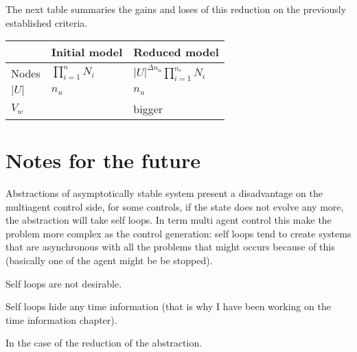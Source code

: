 The next table summaries the gains and loses of this reduction on the previously established criteria.

\begin{tabular}{ l|ll }
& Initial model & Reduced model\\ \hline
Nodes & $\prod_{i=1}^n N_i$ & $\left | U \right |^{\Delta n_u} \prod_{i=1}^{n_c} N_i $\\ 
$|U|$ & $n_u$ & $n_u$\\
$V_w$ &  & bigger \\
\end{tabular}

\section{Notes for the future}
Abstractions of asymptotically stable system present a disadvantage on the multiagent control side, for some controls, if the state does not evolve any more, the abstraction will take self loops.
In term multi agent control this make the problem more complex as the control generation: self loops tend to create systems that are asynchronous with all the problems that might occurs because of this (basically one of the agent might be be stopped).

Self loops are not desirable.

Self loops hide any time information (that is why I have been working on the time information chapter).

In the case of the reduction of the abstraction.
